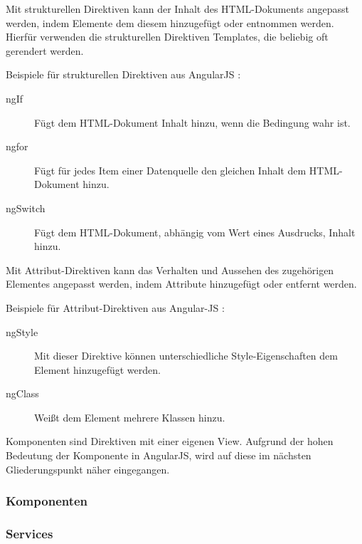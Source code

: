 Mit strukturellen Direktiven kann der Inhalt des HTML-Dokuments angepasst werden, indem Elemente dem diesem hinzugefügt oder entnommen werden. Hierfür verwenden die strukturellen Direktiven Templates, die beliebig oft gerendert werden. \autocites[vgl.][269\psqq]{Steyer.2017}[vgl.][365]{Freeman.2018}

Beispiele für strukturellen Direktiven aus AngularJS \autocite[vgl.][261\psqq]{Freeman.2018}:
\begin{description}
	\item [ngIf] Fügt dem HTML-Dokument Inhalt hinzu, wenn die Bedingung wahr ist. 
	\item [ngfor] Fügt für jedes Item einer Datenquelle den gleichen Inhalt dem HTML-Dokument hinzu.
	\item [ngSwitch] Fügt dem HTML-Dokument, abhängig vom Wert eines Ausdrucks, Inhalt hinzu.
\end{description} 

Mit Attribut-Direktiven kann das Verhalten und Aussehen des zugehörigen Elementes angepasst werden, indem Attribute hinzugefügt oder entfernt werden. \autocite[vgl.][339]{Freeman.2018} 

Beispiele für Attribut-Direktiven aus Angular-JS \autocite[vgl.][249\psqq]{Freeman.2018}:
\begin{description}
	\item [ngStyle] Mit dieser Direktive können unterschiedliche Style-Eigenschaften dem Element hinzugefügt werden.
	\item [ngClass] Weißt dem Element mehrere Klassen hinzu. 
\end{description}

Komponenten sind Direktiven mit einer eigenen View. \autocites[vgl.][265]{Steyer.2017}[vgl.][401]{Freeman.2018} Aufgrund der hohen Bedeutung der Komponente in AngularJS, wird auf diese im nächsten Gliederungspunkt näher eingegangen.

\subsubsection{Komponenten}



\subsubsection{Services}


